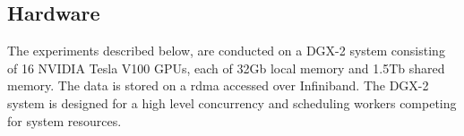 
\subsection{Hardware} \label{sec:hardware}
The experiments described below, are conducted on a 
DGX-2 system consisting of 16 NVIDIA Tesla V100 GPUs, each of 32Gb local memory and 1.5Tb shared memory. %
The data is stored on a \acrfull{rdma} accessed over Infiniband. %
The DGX-2 system is designed for a high level concurrency and scheduling workers competing for system resources.

